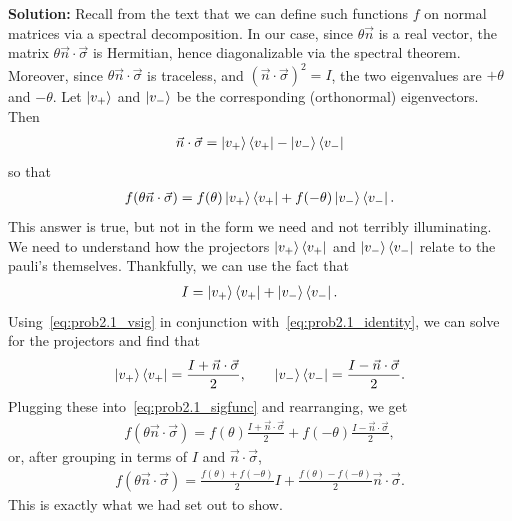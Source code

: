 \documentclass{book}
\begin{document}
    \textbf{Solution:} Recall from the text that we can define such functions $f$ on normal matrices via a spectral decomposition. In our case, since $\theta \vec{n}$ is a real vector, the matrix $\theta \vec{n} \cdot \vec{\sigma}$ is Hermitian, hence diagonalizable via the spectral theorem. Moreover, since $\theta \vec{n} \cdot \vec{\sigma}$ is traceless, and $(\vec{n} \cdot \vec{\sigma})^2 = I$, the two eigenvalues are $+\theta$ and $-\theta$. Let $\ket{v_+}$ and $\ket{v_-}$ be the corresponding (orthonormal) eigenvectors. Then
    \begin{align} \label{eq:prob2.1_vsig}
        \vec{n} \cdot \vec{\sigma} = \ket{v_+}\bra{v_+} - \ket{v_-}\bra{v_-}
    \end{align}
    so that
    \begin{align} \label{eq:prob2.1_sigfunc}
        f(\theta \vec{n} \cdot \vec{\sigma}) = f(\theta) \ket{v_+}\bra{v_+} + f(-\theta) \ket{v_-}\bra{v_-}.
    \end{align}
    This answer is true, but not in the form we need and not terribly illuminating. We need to understand how the projectors $\ket{v_+}\bra{v_+}$ and $\ket{v_-}\bra{v_-}$ relate to the pauli's themselves. Thankfully, we can use the fact that
    \begin{align} \label{eq:prob2.1_identity}
        I = \ket{v_+}\bra{v_+} + \ket{v_-}\bra{v_-}.
    \end{align}
    Using~\eqref{eq:prob2.1_vsig} in conjunction with~\eqref{eq:prob2.1_identity}, we can solve for the projectors and find that
    \begin{align}
        \ket{v_+}\bra{v_+} = \frac{I + \vec{n} \cdot \vec{\sigma}}{2}, \qquad \ket{v_-}\bra{v_-} = \frac{I - \vec{n} \cdot \vec{\sigma}}{2}.
    \end{align}
    Plugging these into~\eqref{eq:prob2.1_sigfunc} and rearranging, we get
    \begin{align}
        f(\theta \vec{n} \cdot \vec{\sigma}) = f(\theta) \frac{I + \vec{n} \cdot \vec{\sigma}}{2} + f(-\theta) \frac{I - \vec{n} \cdot \vec{\sigma}}{2},
    \end{align}
    or, after grouping in terms of $I$ and $\vec{n} \cdot \vec{\sigma}$,
    \begin{align}
        f(\theta \vec{n} \cdot \vec{\sigma}) = \frac{f(\theta) + f(-\theta)}{2} I + \frac{f(\theta)- f(-\theta)}{2} \vec{n} \cdot \vec{\sigma}.
    \end{align}
    This is exactly what we had set out to show.
\end{document}
